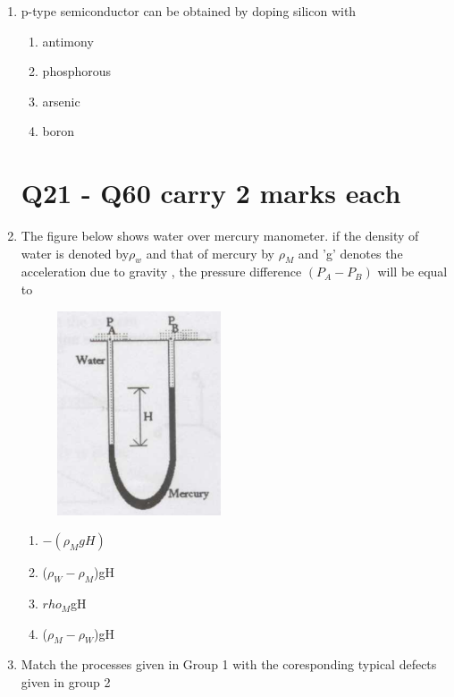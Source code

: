 \documentclass[journal]{IEEEtran}
\theoremstyle{remark}
\begin{document}
\begin{enumerate}
\item p-type semiconductor can be obtained by doping silicon with\hfill{}
\begin{multicols}{4}
\begin{enumerate}
\item antimony
\item phosphorous
\item arsenic
\item boron
\end{enumerate}
\end{multicols}

\section{Q21 - Q60 carry 2 marks each}
\item The figure below shows water over mercury manometer. if the density of water is denoted by$\rho_w$ and that of mercury by $\rho_M$ and 'g' denotes the acceleration due to gravity , the pressure difference $(P_A - P_B)$ will be equal to\hfill{}
\begin{figure}[h]
    \centering
    \includegraphics[width=0.2\linewidth]{IMAGES/Q.21.png}
    \label{fig:placeholder}
\end{figure}
\begin{multicols}{4}
\begin{enumerate}
    \item $-(\rho_M gH)$
    \item ($ \rho_W  -\rho_M$)gH
    \item  $rho_M$gH
    \item ($\rho_M-\rho_W$)gH
\end{enumerate}
\end{multicols}
\item Match the processes given in Group 1 with the coresponding typical defects given in group 2\hfill{}\\
\begin{center}
\begin{tabular}{c c}
 

\end{tabular}
\end{center}
\end{enumerate}
\end{document}
